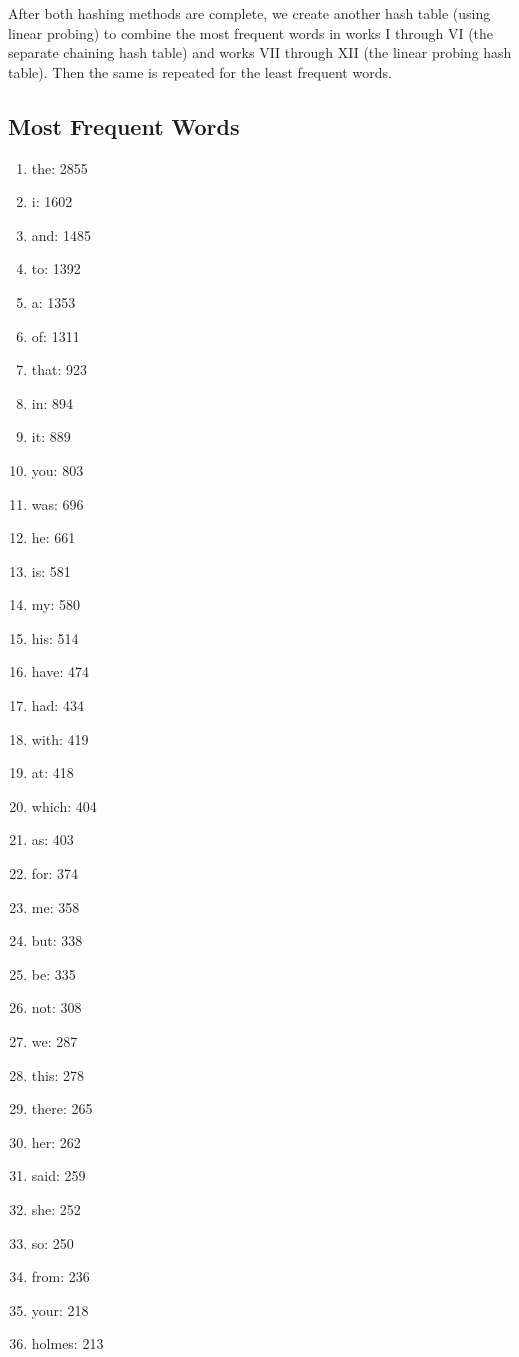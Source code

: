 \documentclass[12pt]{article}
\begin{document}
After both hashing methods are complete, we create another hash table (using linear probing) to combine the most frequent words in works I through VI (the separate chaining hash table) and works VII through XII (the linear probing hash table). Then the same is repeated for the least frequent words.

\newpage
\subsection{Most Frequent Words}
\begin{enumerate}
\item the: 2855
\item i: 1602
\item and: 1485
\item to: 1392
\item a: 1353
\item of: 1311
\item that: 923
\item in: 894
\item it: 889
\item  you: 803
\item  was: 696
\item  he: 661
\item  is: 581
\item  my: 580
\item  his: 514
\item  have: 474
\item  had: 434
\item  with: 419
\item  at: 418
\item  which: 404
\item  as: 403
\item  for: 374
\item  me: 358
\item  but: 338
\item  be: 335
\item  not: 308
\item  we: 287
\item  this: 278
\item  there: 265
\item  her: 262
\item  said: 259
\item  she: 252
\item  so: 250
\item  from: 236
\item  your: 218
\item  holmes: 213

\end{enumerate}
\end{document}
